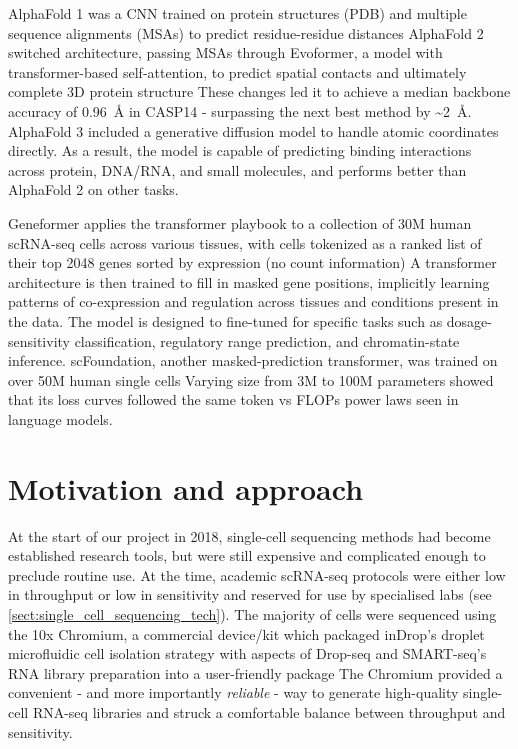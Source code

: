 AlphaFold 1 was a CNN trained on protein structures (PDB) and multiple sequence alignments (MSAs) to predict residue-residue distances AlphaFold 2 switched architecture, passing MSAs through Evoformer, a model with transformer-based self-attention, to predict spatial contacts and ultimately complete 3D protein structure These changes led it to achieve a median backbone accuracy of \SI{0.96}{\angstrom} in CASP14 - surpassing the next best method by \textasciitilde\SI{2}{\angstrom}. AlphaFold 3 included a generative diffusion model to handle atomic coordinates directly. As a result, the model is capable of predicting binding interactions across protein, DNA/RNA, and small molecules, and performs better than AlphaFold 2 on other tasks.

Geneformer applies the transformer playbook to a collection of 30M human scRNA-seq cells across various tissues, with cells tokenized as a ranked list of their top 2048 genes sorted by expression (no count information) A transformer architecture is then trained to fill in masked gene positions, implicitly learning patterns of co-expression and regulation across tissues and conditions present in the data. The model is designed to fine-tuned for specific tasks such as dosage-sensitivity classification, regulatory range prediction, and chromatin-state inference. scFoundation, another masked-prediction transformer, was trained on over 50M human single cells Varying size from 3M to 100M parameters showed that its loss curves followed the same token vs FLOPs power laws seen in language models.

\section{Motivation and approach}
At the start of our project in 2018, single-cell sequencing methods had become established research tools, but were still expensive and complicated enough to preclude routine use. At the time, academic scRNA-seq protocols were either low in throughput or low in sensitivity and reserved for use by specialised labs (see \autoref{sect:single_cell_sequencing_tech}). The majority of cells were sequenced using the 10x Chromium, a commercial device/kit which packaged inDrop's droplet microfluidic cell isolation strategy with aspects of Drop-seq and SMART-seq's RNA library preparation into a user-friendly package The Chromium provided a convenient - and more importantly \textit{reliable} - way to generate high-quality single-cell RNA-seq libraries and struck a comfortable balance between throughput and sensitivity.

